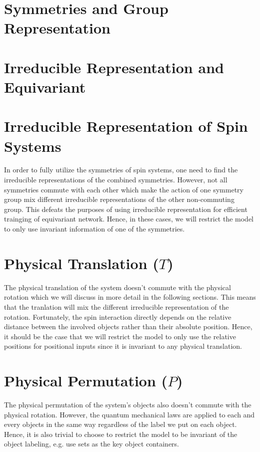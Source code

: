 \documentclass[reprint, 10pt]{revtex4-2}
\begin{document}
\section{Symmetries and Group Representation}


\section{Irreducible Representation and Equivariant}


\section{Irreducible Representation of Spin Systems}
In order to fully utilize the symmetries of spin systems, one need to find the irreducible representations of the combined
symmetries. However, not all symmetries commute with each other which make the action of one symmetry group mix different 
irreducible representations of the other non-commuting group. This defeats the purposes of using irreducible representation 
for efficient trainging of equivariant network. Hence, in these cases, we will restrict the model to only use invariant 
information of one of the symmetries.

\section{Physical Translation ($T$)}
The physical translation of the system doesn't commute with the physical rotation which we will discuss in more
detail in the following sections. This means that the tranlation will mix the different irreducible representation of 
the rotation. Fortunately, the spin interaction directly depends on the relative distance between the involved objects
rather than their absolute position. Hence, it should be the case that we will restrict the model to only use the relative 
positions for positional inputs since it is invariant to any physical translation.

\section{Physical Permutation ($P$)}
The physical permutation of the system's objects also doesn't commute with the physical rotation. However, the quantum
mechanical laws are applied to each and every objects in the same way regardless of the label we put on each object.
Hence, it is also trivial to choose to restrict the model to be invariant of the object labeling, e.g. use sets as the
key object containers.
\end{document}
